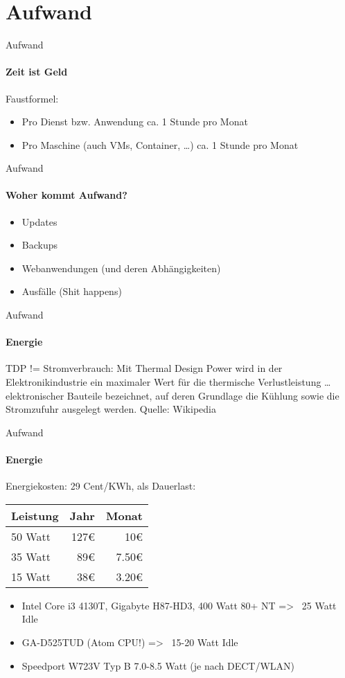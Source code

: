 \section{Aufwand}

\begin{frame}{Aufwand}
\framesubtitle{Zeit ist Geld}
Faustformel:
\begin{itemize}
\item Pro Dienst bzw. Anwendung ca. 1 Stunde pro Monat
\pause
\item Pro Maschine (auch VMs, Container, …) ca. 1 Stunde pro Monat
\end{itemize}
\end{frame}

\begin{frame}{Aufwand}
\framesubtitle{Woher kommt Aufwand?}
\begin{itemize}
\item Updates
\pause
\item Backups
\pause
\item Webanwendungen (und deren Abhängigkeiten)
\pause
\item Ausfälle (Shit happens)
\end{itemize}
\end{frame}

\begin{frame}{Aufwand}
\framesubtitle{Energie}
TDP != Stromverbrauch:
Mit Thermal Design Power wird in der Elektronikindustrie ein maximaler Wert für die thermische Verlustleistung … elektronischer Bauteile bezeichnet, auf deren Grundlage die Kühlung sowie die Stromzufuhr ausgelegt werden.
Quelle: Wikipedia
\end{frame}

\begin{frame}{Aufwand}
\framesubtitle{Energie}
Energiekosten: 29 Cent/KWh, als Dauerlast:\\
\pause
\begin{tabular}{|l|r|r|}
\hline
\textbf{Leistung} & \textbf{Jahr} & \textbf{Monat} \\
\hline
50 Watt & 127€ &  10€ \\
\hline
35 Watt & 89€ & 7.50€ \\
\hline
15 Watt & 38€ & 3.20€ \\
\hline
\end{tabular}
\pause
\begin{itemize}
\item Intel Core i3 4130T, Gigabyte H87-HD3, 400 Watt 80+ NT => ~25 Watt Idle
\pause
\item GA-D525TUD (Atom CPU!) => ~15-20 Watt Idle
\pause
\item Speedport W723V Typ B 7.0-8.5 Watt (je nach DECT/WLAN)
\end{itemize}
\end{frame}

